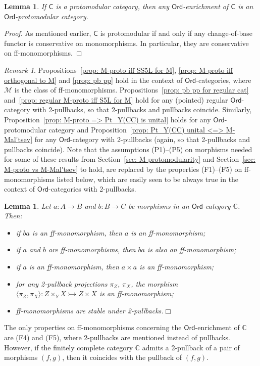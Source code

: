 \documentclass[11pt]{amsart}
\theoremstyle{plain}
\newtheorem{lemma}[subsection]{Lemma}
\theoremstyle{definition}
\theoremstyle{remark}
\newtheorem{remark}[subsection]{Remark}
\newcommand{\C}{\ensuremath{\mathsf{C}}}
\newcommand{\CC}{\ensuremath{\mathbb{C}}}
\newcommand{\Ord}{\ensuremath{\mathsf{Ord}}}
\newcommand{\M}{\ensuremath{\mathscr{M}}}
\newcommand{\la}{\langle}
\newcommand{\ra}{\rangle}
\newcommand{\mono}{\rightarrowtail}
\begin{document}
\begin{lemma}\label{lem: proto => Ord-proto} If $\C$ is a protomodular category, then any $\Ord$-enrichment of $\C$ is an $\Ord$-pro\-to\-mo\-du\-lar category.
\end{lemma}
\begin{proof} As mentioned earlier, $\C$ is protomodular if and only if any change-of-base functor is conservative on monomorphisms. In particular, they are conservative on ff-monomorphisms.
\end{proof}

\begin{remark} Propositions~\ref{prop: M-proto iff SS5L for M}, \ref{prop: M-proto iff orthogonal to M} and \ref{prop: pb pp} hold in the context of $\Ord$-categories, where $\M$ is the class of ff-monomorphisms. Propositions~\ref{prop: pb pp for regular cat} and~\ref{prop: regular M-proto iff S5L for M} hold for any (pointed) regular $\Ord$-category with 2-pullbacks, so that 2-pullbacks and pullbacks coincide. Similarly, Proposition~\ref{prop: M-proto => Pt_Y(CC) is unital} holds for any $\Ord$-protomodular category and Proposition~\ref{prop: Pt_Y(CC) unital <=> M-Mal'tsev} for any $\Ord$-category with 2-pullbacks (again, so that 2-pullbacks and pullbacks coincide). Note that the assumptions (P1)--(P5) on morphisms needed for some of these results from Section~\ref{sec: M-protomodularity} and Section~\ref{sec: M-proto vs M-Mal'tsev} to hold, are replaced by the properties (F1)--(F5) on ff-monomorphisms listed below, which are easily seen to be always true in the context of $\Ord$-categories with 2-pullbacks.
\end{remark}
\begin{lemma}\label{pps for ff-ms}
Let $a\colon A\to B$ and $b\colon B\to C$ be morphisms in an $\Ord$-category $\CC$. Then:
\begin{itemize}
	\item[(F1)] if $ba$ is an ff-monomorphism, then $a$ is an ff-monomorphism;
	\item[(F2)] if $a$ and $b$ are ff-monomorphisms, then $ba$ is also an ff-monomorphism;
	\item[(F3)] if $a$ is an ff-monomorphism, then $a\times a$ is an ff-monomorphism;
	\item[(F4)] for any 2-pullback projections $\pi_Z$, $\pi_X$, the morphism $\la \pi_Z,\pi_X\ra\colon Z\times_Y X\mono Z\times X$ is an ff-monomorphism;
	\item[(F5)] ff-monomorphisms are stable under 2-pullbacks.\hfill $\Box$
\end{itemize}
\end{lemma}
The only properties on ff-monomorphisms concerning the $\Ord$-enrichment of $\CC$ are (F4) and (F5), where 2-pullbacks are mentioned instead of pullbacks. However, if the finitely complete category $\CC$ admits a 2-pullback of a pair of morphisms $(f,g)$, then it coincides with the pullback of $(f,g)$.
\end{document}
